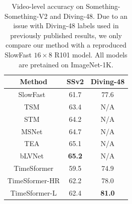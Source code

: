 \documentclass{article}
\begin{document}
 
 
\begin{table}
\centering
{\scriptsize
 \begin{tabular}{c c c }
 \hline
 {Method} & {SSv2} & {Diving-48\boldmath{$^{**}$}} \\ 
 \hline
SlowFast~\cite{slowfast} & 61.7 & 77.6 \\
TSM~\cite{lin2019tsm} & 63.4 & N/A \\
STM~\cite{Jiang_2019_ICCV}  & 64.2 & N/A \\
MSNet~\cite{kwon2020motionsqueeze} & 64.7 & N/A \\
TEA~\cite{Li_2020_CVPR} & 65.1 & N/A \\
bLVNet~\cite{NEURIPS2019_3d779cae} & \bf 65.2 & N/A \\
\hline
TimeSformer & 59.5  & 74.9 \\
TimeSformer-HR & 62.2  & 78.0 \\
TimeSformer-L & 62.4 & \bf 81.0\\
 \hline
 \end{tabular}
 }
\vspace{-0.1cm}
\caption{{Video-level accuracy on Something-Something-V2 and Diving-48}. %
\boldmath{${^{**}}$}Due to an issue with Diving-48 labels used in previously published results, we only compare our method with a reproduced SlowFast $16 \times 8$ R101 model. All models are pretained on ImageNet-1K.\vspace{-0.3cm}}%
\label{ssv2_results_table}
 \end{table}
\end{document}

